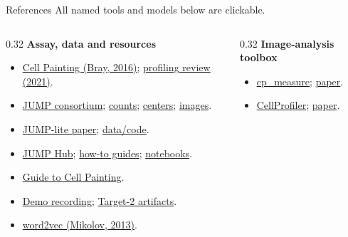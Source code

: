 \documentclass[aspectratio=169,10pt]{beamer}
\begin{document}
\begin{frame}[label={sec:org0000017}]{References}
{\footnotesize All named tools and models below are clickable.}
\medskip
\begin{columns}[T,onlytextwidth]
\begin{column}{0.32\textwidth}
\footnotesize
\textbf{Assay, data and resources}
\begin{itemize}
\item \href{https://doi.org/10.1038/nprot.2016.105}{Cell Painting (Bray, 2016)}; \href{https://doi.org/10.1038/s41573-020-00117-w}{profiling review (2021)}.
\item \href{https://jump-cellpainting.broadinstitute.org/}{JUMP consortium}; \href{https://github.com/jump-cellpainting/datasets/tree/016e865fa0691244e0860943e41c7d6a88ed2580/metadata}{counts}; \href{https://github.com/broadinstitute/jump_hub/blob/e742f5aa37472eb17f326ba8315d22b27e58f330/explanations/data_description.md}{centers}; \href{https://github.com/jump-cellpainting/datasets/blob/016e865fa0691244e0860943e41c7d6a88ed2580/stats/cpg0016_source_images_tiff_count.csv}{images}.
\item \href{https://arxiv.org/abs/2608.07632v3}{JUMP-lite paper}; \href{https://github.com/afermg/JUMP_lite}{data/code}.
\item \href{https://broadinstitute.github.io/jump_hub/}{JUMP Hub}; \href{https://broadinstitute.github.io/jump_hub/howto/interactive/1_jumprr_steps.html}{how-to guides}; \href{https://broadinstitute.github.io/jump_hub/howto/notebooks/0_overview.html}{notebooks}.
\item \href{https://ciminilab.github.io/GuideToCellPainting/}{Guide to Cell Painting}.
\item \href{https://doi.org/10.5281/zenodo.23462248}{Demo recording}; \href{https://github.com/afermg/JUMP_lite/blob/main/cpg_upload/TARGET2_ARTIFACTS_README.md}{Target-2 artifacts}.
\item \href{https://arxiv.org/abs/1301.3781}{word2vec (Mikolov, 2013)}.
\end{itemize}
\end{column}
\begin{column}{0.32\textwidth}
\footnotesize
\textbf{Image-analysis toolbox}
\begin{itemize}
\item \href{https://github.com/afermg/cp_measure}{cp\_measure}; \href{https://arxiv.org/abs/2507.01163v1}{paper}.
\item \href{https://cellprofiler.org/}{CellProfiler}; \href{https://doi.org/10.1186/gb-2006-7-10-r100}{paper}.

\end{itemize}
\end{column}
\end{columns}
\end{frame}
\end{document}
